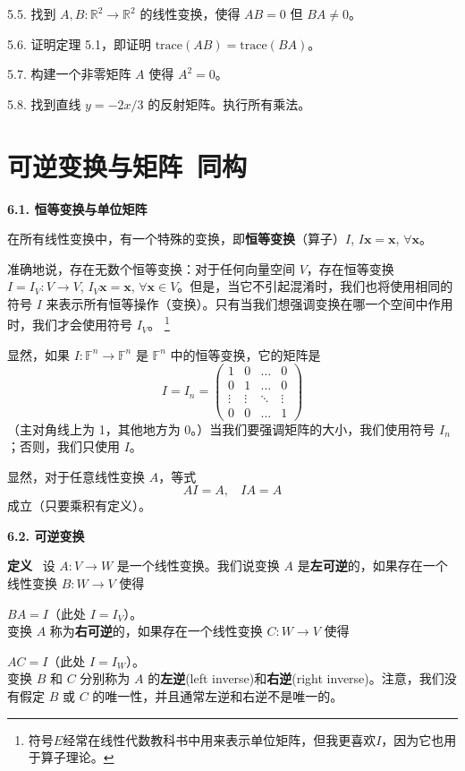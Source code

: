 5.5. 找到 $A, B: \mathbb{R}^2 \to \mathbb{R}^2$ 的线性变换，使得 $AB = 0$ 但 $BA \neq 0$。

5.6. 证明定理 5.1，即证明 $\text{trace}(AB) = \text{trace}(BA)$。

5.7. 构建一个非零矩阵 $A$ 使得 $A^2 = 0$。

5.8. 找到直线 $y = -2x/3$ 的反射矩阵。执行所有乘法。


\section{可逆变换与矩阵~同构}

\textbf{6.1. 恒等变换与单位矩阵}

在所有线性变换中，有一个特殊的变换，即\textbf{恒等变换}（算子）$I$, $I \mathbf{x} = \mathbf{x}$, $\forall \mathbf{x}$。

准确地说，存在无数个恒等变换：对于任何向量空间 $V$，存在恒等变换 $I = I_V: V \to V$, $I_V \mathbf{x} = \mathbf{x}$, $\forall \mathbf{x} \in V$。但是，当它不引起混淆时，我们也将使用相同的符号 $I$ 来表示所有恒等操作（变换）。只有当我们想强调变换在哪一个空间中作用时，我们才会使用符号 $I_V$。
\footnote{
符号$E$经常在线性代数教科书中用来表示单位矩阵，但我更喜欢$I$，因为它也用于算子理论。
}

显然，如果 $I: \mathbb{F}^n \to \mathbb{F}^n$ 是 $\mathbb{F}^n$ 中的恒等变换，它的矩阵是
$$
I = I_n = \begin{pmatrix}
1 & 0 & \dots & 0 \\
0 & 1 & \dots & 0 \\
\vdots & \vdots & \ddots & \vdots \\
0 & 0 & \dots & 1
\end{pmatrix}
$$
（主对角线上为 1，其他地方为 0。）当我们要强调矩阵的大小，我们使用符号 $I_n$；否则，我们只使用 $I$。

显然，对于任意线性变换 $A$，等式 $$AI = A,~~~~IA = A$$ 成立（只要乘积有定义）。

\textbf{6.2. 可逆变换}

\textbf{定义}~
设 $A: V \to W$ 是一个线性变换。我们说变换 $A$ 是\textbf{左可逆}的，如果存在一个线性变换 $B: W \to V$ 使得 

$BA = I$（此处 $I = I_V$）。
\\
变换 $A$ 称为\textbf{右可逆}的，如果存在一个线性变换 $C: W \to V$ 使得 

$AC = I$（此处 $I = I_W$）。
\\
变换 $B$ 和 $C$ 分别称为 $A$ 的\textbf{左逆}(left inverse)和\textbf{右逆}(right inverse)。注意，我们没有假定 $B$ 或 $C$ 的唯一性，并且通常左逆和右逆不是唯一的。

